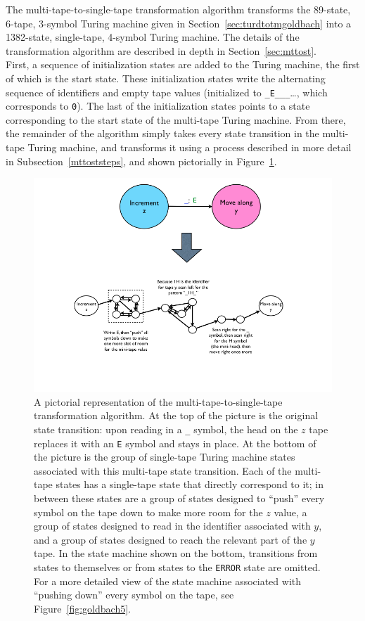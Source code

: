 The multi-tape-to-single-tape transformation algorithm transforms the 89-state, 6-tape, 3-symbol Turing machine given in Section~\ref{sec:turdtotmgoldbach} into a 1382-state, single-tape, 4-symbol Turing machine. The details of the transformation algorithm are described in depth in Section~\ref{sec:mttost}. \\

First, a sequence of initialization states are added to the Turing machine, the first of which is the start state. These initialization states write the alternating sequence of identifiers and empty tape values (initialized to \texttt{\_E\_\_\_}\dots, which corresponds to \texttt{0}). The last of the initialization states points to a state corresponding to the start state of the multi-tape Turing machine. From there, the remainder of the algorithm simply takes every state transition in the multi-tape Turing machine, and transforms it using a process described in more detail in Subsection~\ref{mttoststeps}, and shown pictorially in Figure~\ref{fig:goldbach4}.

\begin{figure} 
\begin{center} 
\includegraphics[scale=0.4]{figs/goldbach4.png} 
\caption{A pictorial representation of the multi-tape-to-single-tape transformation algorithm. At the top of the picture is the original state transition: upon reading in a \texttt{\_} symbol, the head on the $z$ tape replaces it with an \texttt{E} symbol and stays in place. At the bottom of the picture is the group of single-tape Turing machine states associated with this multi-tape state transition. Each of the multi-tape states has a single-tape state that directly correspond to it; in between these states are a group of states designed to ``push'' every symbol on the tape down to make more room for the $z$ value, a group of states designed to read in the identifier associated with $y$, and a group of states designed to reach the relevant part of the $y$ tape. In the state machine shown on the bottom, transitions from states to themselves or from states to the \texttt{ERROR} state are omitted. For a more detailed view of the state machine associated with ``pushing down'' every symbol on the tape, see Figure~\ref{fig:goldbach5}. \label{fig:goldbach4}}
\end{center} 
\end{figure}

